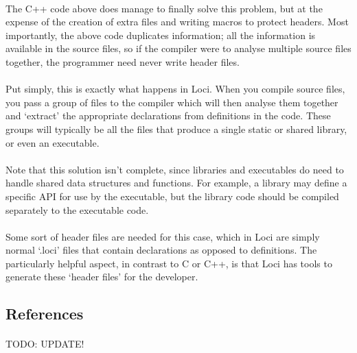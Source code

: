 \documentclass[12pt,twoside,notitlepage]{report}
\begin{document}
\paragraph{}
The C++ code above does manage to finally solve this problem, but at the expense of the creation of extra files and writing macros to protect headers. Most importantly, the above code duplicates information; all the information is available in the source files, so if the compiler were to analyse multiple source files together, the programmer need never write header files.

\paragraph{}
Put simply, this is exactly what happens in Loci. When you compile source files, you pass a group of files to the compiler which will then analyse them together and `extract' the appropriate declarations from definitions in the code. These groups will typically be all the files that produce a single static or shared library, or even an executable.

\paragraph{}
Note that this solution isn't complete, since libraries and executables do need to handle shared data structures and functions. For example, a library may define a specific API for use by the executable, but the library code should be compiled separately to the executable code.

\paragraph{}
Some sort of header files are needed for this case, which in Loci are simply normal `.loci' files that contain declarations as opposed to definitions. The particularly helpful aspect, in contrast to C or C++, is that Loci has tools to generate these `header files' for the developer.

\clearpage

\subsection{References}

\paragraph{}
TODO: UPDATE!
\end{document}
